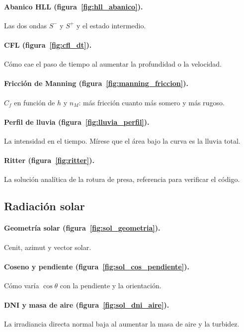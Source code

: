 \documentclass[11pt,a4paper]{article}
\begin{document}
\paragraph{Abanico HLL (figura~\ref{fig:hll_abanico}).} Las dos ondas $S^-$ y $S^+$ y el estado intermedio.

\paragraph{CFL (figura~\ref{fig:cfl_dt}).} Cómo cae el paso de tiempo al aumentar la profundidad o la velocidad.

\paragraph{Fricción de Manning (figura~\ref{fig:manning_friccion}).} $C_f$ en función de $h$ y $n_M$: más fricción
cuanto más somero y más rugoso.

\paragraph{Perfil de lluvia (figura~\ref{fig:lluvia_perfil}).} La intensidad en el tiempo. Mírese que el área bajo
la curva es la lluvia total.

\paragraph{Ritter (figura~\ref{fig:ritter}).} La solución analítica de la rotura de presa, referencia
para verificar el código.

\subsection*{Radiación solar}

\paragraph{Geometría solar (figura~\ref{fig:sol_geometria}).} Cenit, azimut y vector solar.

\paragraph{Coseno y pendiente (figura~\ref{fig:sol_cos_pendiente}).} Cómo varía $\cos\theta$ con la pendiente
y la orientación.

\paragraph{DNI y masa de aire (figura~\ref{fig:sol_dni_aire}).} La irradiancia directa normal baja al
aumentar la masa de aire y la turbidez.
\end{document}
